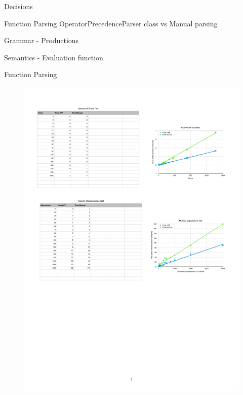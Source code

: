 \begin{frame}
    \centering
    \Large
    Decisions
\end{frame}

\begin{frame}{Function Parsing}
OperatorPrecedenceParser class vs Manual parsing

Grammar - Productions

Semantics - Evaluation function
\end{frame}

\begin{frame}{Function Parsing}
    \begin{figure}
        \centering
        \includegraphics[page=1, width = 0.9\linewidth]{.figures/FunctionParsingTimes.pdf}
    \end{figure}
\end{frame}


